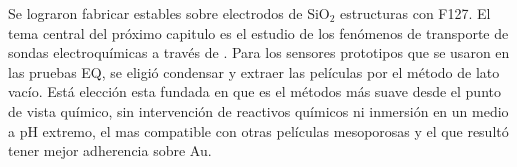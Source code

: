 	Se lograron fabricar \pdm\space estables sobre electrodos de SiO$_2$ estructuras con F127. El tema central del próximo capitulo es el estudio de los fenómenos de transporte de sondas electroquímicas a través de \pdm. Para los sensores prototipos que se usaron en las pruebas EQ, se eligió condensar y extraer las películas por el método de lato vacío. Está elección esta fundada en que es el métodos más suave desde el punto de vista químico, sin intervención de reactivos químicos ni inmersión en un medio a pH extremo, el mas compatible con otras películas mesoporosas y el que resultó tener mejor adherencia sobre Au. 			 

	



	



